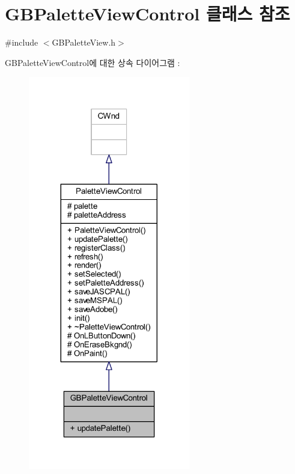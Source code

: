 \hypertarget{class_g_b_palette_view_control}{}\section{G\+B\+Palette\+View\+Control 클래스 참조}
\label{class_g_b_palette_view_control}


{\ttfamily \#include $<$G\+B\+Palette\+View.\+h$>$}



G\+B\+Palette\+View\+Control에 대한 상속 다이어그램 \+: \nopagebreak
\begin{figure}[H]
\begin{center}
\leavevmode
\includegraphics[width=200pt]{class_g_b_palette_view_control__inherit__graph}
\end{center}
\end{figure}


